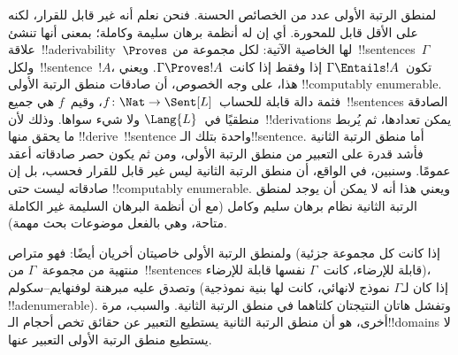 \documentclass[../../../include/open-logic-section]{subfiles}
\begin{document}


لمنطق الرتبة الأولى عدد من الخصائص الحسنة. فنحن نعلم أنه غير قابل
للقرار، لكنه على الأقل قابل للمحورة. أي إن له أنظمة برهان سليمة وكاملة؛
بمعنى أنها تنشئ علاقة~!!a{derivability}~$\Proves$ لها الخاصية الآتية:
لكل مجموعة من~!!{sentence}s~$\Gamma$ ولكل~!!{sentence}~$!A$،
تكون~$\Gamma \Entails !A$ إذا وفقط إذا كانت~$\Gamma \Proves !A$.
ويعني هذا، على وجه الخصوص، أن صادقات منطق الرتبة الأولى
!!{computably
  enumerable}. فثمة دالة قابلة للحساب~$f\colon \Nat \to
\Sent[L]$، وقيم~$f$ هي جميع~!!{sentence}s الصادقة منطقيًا في~$\Lang{L}$
ولا شيء سواها. وذلك لأن~!!{derivation}s يمكن تعدادها، ثم يُربط
ما يحقق منها !!{derive}~!!{sentence} واحدة بتلك
الـ!!{sentence}. أما منطق الرتبة الثانية فأشد قدرة على التعبير من منطق
الرتبة الأولى، ومن ثم يكون حصر صادقاته أعقد عمومًا. وسنبين، في الواقع،
أن منطق الرتبة الثانية ليس غير قابل للقرار فحسب، بل إن صادقاته ليست حتى
!!{computably
  enumerable}. ويعني هذا أنه لا يمكن أن يوجد لمنطق الرتبة الثانية نظام
برهان سليم وكامل (مع أن أنظمة البرهان السليمة غير الكاملة متاحة، وهي
بالفعل موضوعات بحث مهمة).

ولمنطق الرتبة الأولى خاصيتان أخريان أيضًا: فهو متراص (إذا كانت كل
مجموعة جزئية منتهية من مجموعة~$\Gamma$ من~!!{sentence}s قابلة للإرضاء،
كانت~$\Gamma$ نفسها قابلة للإرضاء)، وتصدق عليه مبرهنة لوفنهايم--سكولم
(إذا كان لـ$\Gamma$ نموذج لانهائي، كانت لها بنية نموذجية
!!a{denumerable}). وتفشل هاتان النتيجتان كلتاهما في منطق الرتبة
الثانية. والسبب، مرة أخرى، هو أن منطق الرتبة الثانية يستطيع التعبير عن
حقائق تخص أحجام الـ!!{domain}s لا يستطيع منطق الرتبة الأولى التعبير
عنها.
\end{document}
